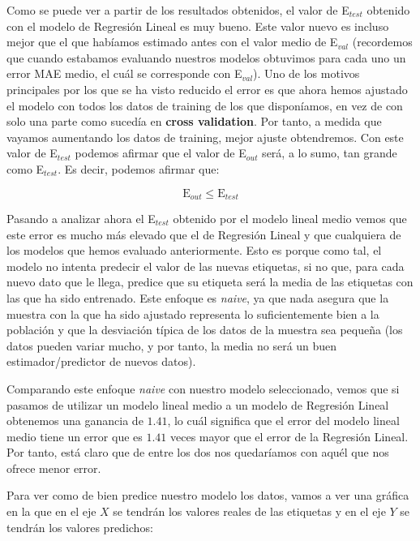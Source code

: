 \documentclass[11pt,a4paper]{article}
\begin{document}
 Como se puede ver a partir de los resultados obtenidos, el valor de
E\(_{test}\) obtenido con el modelo de Regresión Lineal es muy bueno.
Este valor nuevo es incluso mejor que el que habíamos estimado antes con
el valor medio de E\(_{val}\) (recordemos que cuando estabamos evaluando
nuestros modelos obtuvimos para cada uno un error MAE medio, el cuál se
corresponde con E\(_{val}\)). Uno de los motivos principales por los que
se ha visto reducido el error es que ahora hemos ajustado el modelo con
todos los datos de training de los que disponíamos, en vez de con solo
una parte como sucedía en \textbf{cross validation}. Por tanto, a medida
que vayamos aumentando los datos de training, mejor ajuste obtendremos.
Con este valor de E\(_{test}\) podemos afirmar que el valor de
E\(_{out}\) será, a lo sumo, tan grande como E\(_{test}\). Es decir,
podemos afirmar que:

\begin{equation}
    \text{E}_{out} \leq \text{E}_{test}
\end{equation}

Pasando a analizar ahora el E\(_{test}\) obtenido por el modelo lineal
medio vemos que este error es mucho más elevado que el de Regresión
Lineal y que cualquiera de los modelos que hemos evaluado anteriormente.
Esto es porque como tal, el modelo no intenta predecir el valor de las
nuevas etiquetas, si no que, para cada nuevo dato que le llega, predice
que su etiqueta será la media de las etiquetas con las que ha sido
entrenado. Este enfoque es \emph{naive}, ya que nada asegura que la
muestra con la que ha sido ajustado representa lo suficientemente bien a
la población y que la desviación típica de los datos de la muestra sea
pequeña (los datos pueden variar mucho, y por tanto, la media no será un
buen estimador/predictor de nuevos datos).

Comparando este enfoque \emph{naive} con nuestro modelo seleccionado,
vemos que si pasamos de utilizar un modelo lineal medio a un modelo de
Regresión Lineal obtenemos una ganancia de \(1.41\), lo cuál significa
que el error del modelo lineal medio tiene un error que es \(1.41\)
veces mayor que el error de la Regresión Lineal. Por tanto, está claro
que de entre los dos nos quedaríamos con aquél que nos ofrece menor
error.

Para ver como de bien predice nuestro modelo los datos, vamos a ver una
gráfica en la que en el eje \(X\) se tendrán los valores reales de las
etiquetas y en el eje \(Y\) se tendrán los valores predichos:
\end{document}
